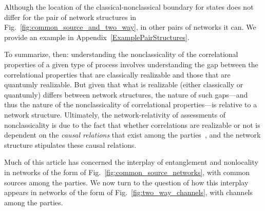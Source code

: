 \documentclass[prx,11pt,letterpaper,twocolumn,accepted=2023-11-27]{quantumarticle}
\theoremstyle{plain}
\theoremstyle{definition}
\begin{document}
 Although the location of the classical-nonclassical boundary for states does not differ for the pair of network structures in Fig.~\ref{fig:common_source_and_two_way}, in other pairs of networks it can.  We provide an example in Appendix~\ref{ExamplePairStructures}.

To summarize, then: understanding the nonclassicality of the correlational properties of a given type of process involves understanding the  gap between the correlational properties that are classically realizable and those that are quantumly realizable. But given that what is realizable (either classically or quantumly) differs between network structures, the nature of such gaps---and thus the nature of the nonclassicality of correlational properties---is relative to a network structure. 
 Ultimately, the network-relativity of assessments of nonclassicality is due to the fact that whether correlations are realizable or not  is dependent on the {\em causal relations} that exist among the parties~\cite{Wood2015,schmid2020unscrambling}, and the network structure stipulates these causal relations.

 Much of this article has concerned the interplay of entanglement and nonlocality in networks of the form of Fig.~\ref{fig:common_source_networks}, with common sources among the parties.  We now turn to the question of how this interplay appears in networks of the form of Fig.~\ref{fig:two_way_channels}, with channels among the parties.
\end{document}
